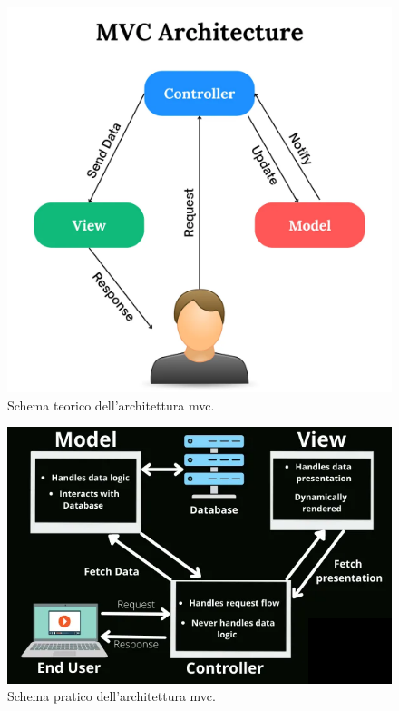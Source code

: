 \begin{figure}[H]
\centering
\includegraphics[width=1\textwidth]{Images/mvc.png}
\caption{\label{fig:mvc}Schema teorico dell'architettura \acrshort{mvc}.}
\end{figure}

\begin{figure}[H]
\centering
\includegraphics[width=1\textwidth]{Images/model-view-controller.png}
\caption{\label{fig:mvc2}Schema pratico dell'architettura \acrshort{mvc}.}
\end{figure}



